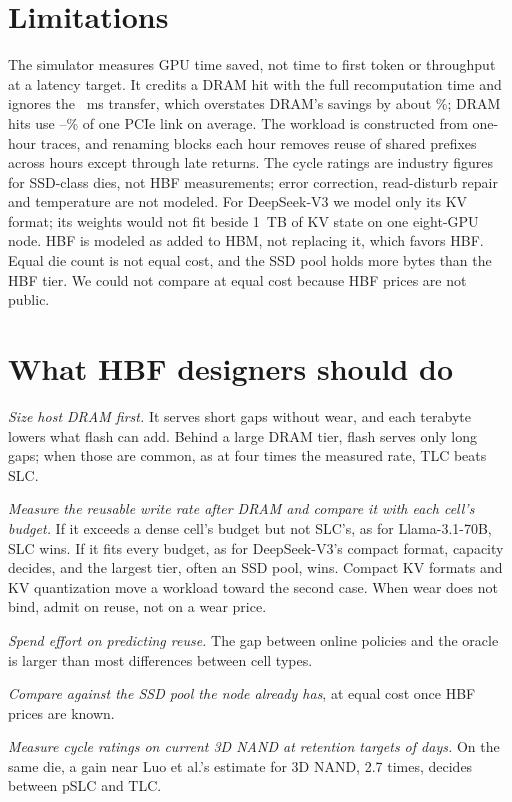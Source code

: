 \documentclass[journal]{IEEEtran}
\begin{document}
\section{Limitations}

The simulator measures GPU time saved, not time to first token or throughput at a latency target. It credits a DRAM hit with the full recomputation time and ignores the \TDramMs{}~ms transfer, which overstates DRAM's savings by about \DramBiasPct{}\%; DRAM hits use \SimDramLinkPctOne{}--\SimDramLinkPctFour{}\% of one PCIe link on average. The workload is constructed from one-hour traces, and renaming blocks each hour removes reuse of shared prefixes across hours except through late returns. The cycle ratings are industry figures for SSD-class dies, not HBF measurements; error correction, read-disturb repair and temperature are not modeled. For DeepSeek-V3 we model only its KV format; its weights would not fit beside 1~TB of KV state on one eight-GPU node. HBF is modeled as added to HBM, not replacing it, which favors HBF. Equal die count is not equal cost, and the SSD pool holds more bytes than the HBF tier. We could not compare at equal cost because HBF prices are not public.

\section{What HBF designers should do}

\emph{Size host DRAM first.} It serves short gaps without wear, and each terabyte lowers what flash can add. Behind a large DRAM tier, flash serves only long gaps; when those are common, as at four times the measured rate, TLC beats SLC.

\emph{Measure the reusable write rate after DRAM and compare it with each cell's budget.} If it exceeds a dense cell's budget but not SLC's, as for Llama-3.1-70B, SLC wins. If it fits every budget, as for DeepSeek-V3's compact format, capacity decides, and the largest tier, often an SSD pool, wins. Compact KV formats and KV quantization move a workload toward the second case. When wear does not bind, admit on reuse, not on a wear price.

\emph{Spend effort on predicting reuse.} The gap between online policies and the oracle is larger than most differences between cell types.

\emph{Compare against the SSD pool the node already has}, at equal cost once HBF prices are known.

\emph{Measure cycle ratings on current 3D NAND at retention targets of days.} On the same die, a gain near Luo et al.'s estimate for 3D NAND, 2.7 times, decides between pSLC and TLC.
\end{document}

